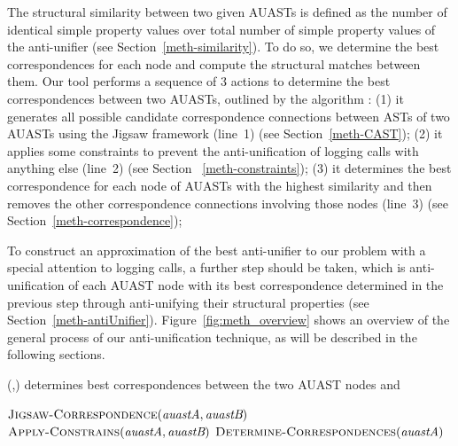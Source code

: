 The structural similarity between two given AUASTs is defined as the number of identical simple property values over total number of simple property values of the anti-unifier (see Section~\ref{meth-similarity}). To do so, we determine the best correspondences for each node and compute the structural matches between them. Our tool performs a sequence of 3 actions to determine the best correspondences between two AUASTs, outlined by the algorithm : (1) it generates all possible candidate correspondence connections between ASTs of two AUASTs using the Jigsaw framework (line~1) (see Section~\ref{meth-CAST}); (2) it applies some constraints to prevent the anti-unification of logging calls with anything else (line~2) (see Section ~\ref{meth-constraints}); (3) it determines the best correspondence for each node of AUASTs with the highest similarity and then removes the other correspondence connections involving those nodes (line~3) (see Section~\ref{meth-correspondence}); 

To construct an approximation of the best anti-unifier to our problem with a special attention to logging calls, a further step should be taken, which is anti-unification of each AUAST node with its best correspondence determined in the previous step through anti-unifying their structural properties (see Section~\ref{meth-antiUnifier}). Figure~\ref{fig:meth_overview} shows an overview of the general process of our anti-unification technique, as will be described in the following sections.


\begin{algorithm}
\caption{(,) determines best correspondences between the two AUAST nodes  and }
\label{overview}
\begin{algorithmic}[1]
\DetermineBest
   \State  $\textsc{Jigsaw-Correspondence}(\textit{auastA},\textit{auastB})$  
   \State $\textsc{Apply-Constrains}(\textit{auastA},\textit{auastB})$
   \State $ \textsc{Determine-Correspondences}(\textit{auastA})$
\end{algorithmic}
\end{algorithm}


